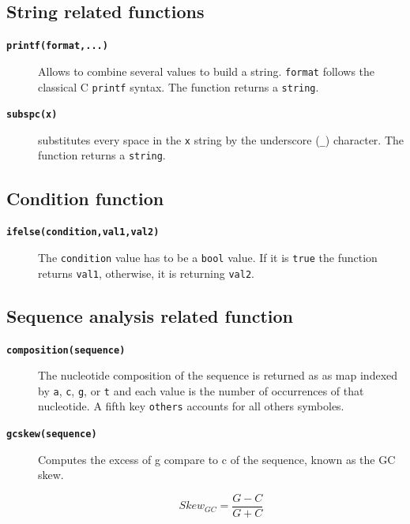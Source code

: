 \documentclass[
  letterpaper,
  DIV=11,
  numbers=noendperiod]{scrreprt}
\begin{document}
\hypertarget{string-related-functions}{%
\subsection*{String related functions}\label{string-related-functions}}

\begin{description}
\item[\textbf{\texttt{printf(format,...)}}]
Allows to combine several values to build a string. \texttt{format}
follows the classical C \texttt{printf} syntax. The function returns a
\texttt{string}.
\item[\textbf{\texttt{subspc(x)}}]
substitutes every space in the \texttt{x} string by the underscore
(\texttt{\_}) character. The function returns a \texttt{string}.
\end{description}

\hypertarget{condition-function}{%
\subsection*{Condition function}\label{condition-function}}

\begin{description}
\item[\textbf{\texttt{ifelse(condition,val1,val2)}}]
The \texttt{condition} value has to be a \texttt{bool} value. If it is
\texttt{true} the function returns \texttt{val1}, otherwise, it is
returning \texttt{val2}.
\end{description}

\hypertarget{sequence-analysis-related-function}{%
\subsection{Sequence analysis related
function}\label{sequence-analysis-related-function}}

\begin{description}
\item[\textbf{\texttt{composition(sequence)}}]
The nucleotide composition of the sequence is returned as as map indexed
by \texttt{a}, \texttt{c}, \texttt{g}, or \texttt{t} and each value is
the number of occurrences of that nucleotide. A fifth key
\texttt{others} accounts for all others symboles.
\item[\textbf{\texttt{gcskew(sequence)}}]
Computes the excess of g compare to c of the sequence, known as the GC
skew.

\[
Skew_{GC}=\frac{G-C}{G+C}
\]
\end{description}
\end{document}
